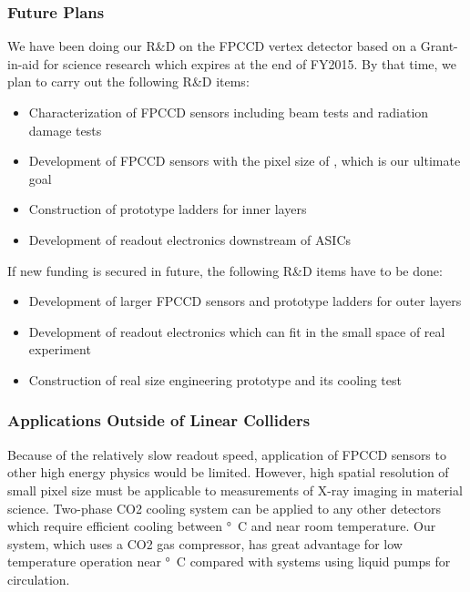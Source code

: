 \subsubsection{Future Plans}
    We have been doing our R\&D on the FPCCD vertex detector based on a Grant-in-aid for science research which expires at the end of FY2015. By that time, we plan to carry out the following R\&D items:
\begin{itemize}
    \item Characterization of FPCCD sensors including beam tests and radiation damage tests
    \item Development of FPCCD sensors with the pixel size of \unit[5]{\micron}, which is our ultimate goal
    \item Construction of prototype ladders for inner layers
    \item Development of readout electronics downstream of ASICs
\end{itemize}
If new funding is secured in future, the following R\&D items have to be done:
\begin{itemize}
    \item Development of larger FPCCD sensors and prototype ladders for outer layers
    \item Development of readout electronics which can fit in the small space of real experiment
    \item Construction of real size engineering prototype and its cooling test
\end{itemize}

\subsubsection{Applications Outside of Linear Colliders}
    Because of the relatively slow readout speed, application of FPCCD sensors to other high energy physics would be limited. However, high spatial resolution of small pixel size must be applicable to measurements of X-ray imaging in material science. 
    Two-phase CO2 cooling system can be applied to any other detectors which require efficient cooling between \unit[-40]{\degree C} and near room temperature. Our system, which uses a CO2 gas compressor, has great advantage for low temperature operation near \unit[-40]{\degree C} compared with systems using liquid pumps for circulation.


